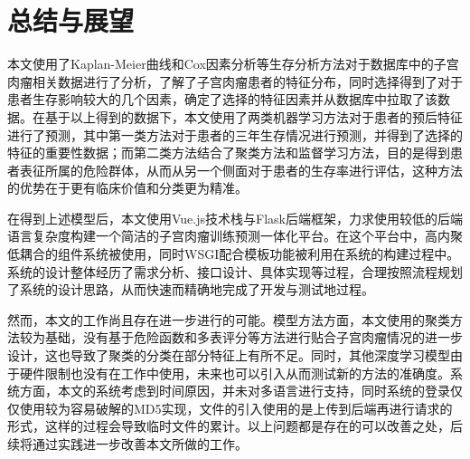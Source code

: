 \chapter{总结与展望}
\label{cha:summary}

本文使用了Kaplan-Meier曲线和Cox因素分析等生存分析方法对于数据库中的子宫肉瘤相关数据进行了分析，了解了子宫肉瘤患者的特征分布，同时选择得到了对于患者生存影响较大的几个因素，确定了选择的特征因素并从数据库中拉取了该数据。在基于以上得到的数据下，本文使用了两类机器学习方法对于患者的预后特征进行了预测，其中第一类方法对于患者的三年生存情况进行预测，并得到了选择的特征的重要性数据；而第二类方法结合了聚类方法和监督学习方法，目的是得到患者表征所属的危险群体，从而从另一个侧面对于患者的生存率进行评估，这种方法的优势在于更有临床价值和分类更为精准。

在得到上述模型后，本文使用Vue.js技术栈与Flask后端框架，力求使用较低的后端语言复杂度构建一个简洁的子宫肉瘤训练预测一体化平台。在这个平台中，高内聚低耦合的组件系统被使用，同时WSGI配合模板功能被利用在系统的构建过程中。系统的设计整体经历了需求分析、接口设计、具体实现等过程，合理按照流程规划了系统的设计思路，从而快速而精确地完成了开发与测试地过程。

然而，本文的工作尚且存在进一步进行的可能。模型方法方面，本文使用的聚类方法较为基础，没有基于危险函数和多表评分等方法进行贴合子宫肉瘤情况的进一步设计，这也导致了聚类的分类在部分特征上有所不足。同时，其他深度学习模型由于硬件限制也没有在工作中使用，未来也可以引入从而测试新的方法的准确度。系统方面，本文的系统考虑到时间原因，并未对多语言进行支持，同时系统的登录仅仅使用较为容易破解的MD5实现，文件的引入使用的是上传到后端再进行请求的形式，这样的过程会导致临时文件的累计。以上问题都是存在的可以改善之处，后续将通过实践进一步改善本文所做的工作。